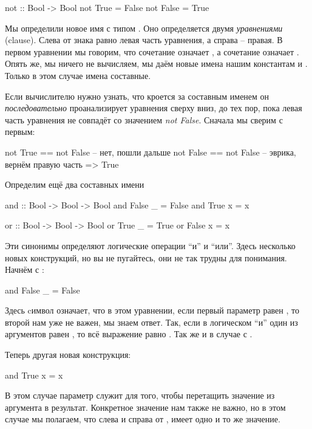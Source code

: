 \begin{code}
not :: Bool -> Bool
not True  = False
not False = True
\end{code}

Мы определили новое имя  с типом . Оно
определяется двумя \emph{уравнениями} (clause). Слева от знака равно
левая часть уравнения, а справа -- правая. В первом уравнении мы
говорим, что сочетание  означает , а сочетание
 означает . Опять же, мы ничего не вычисляем,
мы даём новые имена нашим константам  и . Только в
этом случае имена составные.

Если вычислителю нужно узнать, что кроется за составным именем
 он \emph{последовательно} проанализирует уравнения сверху
вниз, до тех пор, пока левая часть уравнения не совпадёт со значением
\emph{not False}. Сначала мы сверим с первым:


\begin{code}
not True   == not False     -- нет, пошли дальше
not False  == not False     -- эврика, вернём правую часть
=> True
\end{code}

Определим ещё два составных имени


\begin{code}
and :: Bool -> Bool -> Bool
and False  _  = False
and True   x  = x

or  :: Bool -> Bool -> Bool
or True   _ = True
or False  x = x
\end{code}

Эти синонимы определяют логические операции ``и'' и ``или''. Здесь
несколько новых конструкций, но вы не пугайтесь, они не так трудны для
понимания. Начнём с \In{_}:


\begin{code}
and False  _  = False
\end{code}

Здесь cимвол \In{_} означает, что в этом уравнении, если первый параметр
равен , то второй нам уже не важен, мы знаем ответ. Так, если
в логическом ``и'' один из аргументов равен , то всё выражение
равно . Так же и в случае с .

Теперь другая новая конструкция:


\begin{code}
and True   x  = x
\end{code}

В этом случае параметр  служит для того, чтобы перетащить значение
из аргумента в результат. Конкретное значение нам также не важно, но в
этом случае мы полагаем, что слева и справа от \In{=},  имеет одно
и то же значение.

